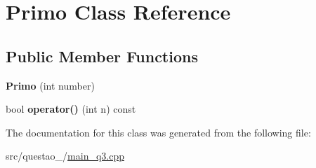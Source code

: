 \hypertarget{classPrimo}{}\section{Primo Class Reference}
\label{classPrimo}
\subsection*{Public Member Functions}
\begin{DoxyCompactItemize}
\item 
{\bfseries Primo} (int number)\hypertarget{classPrimo_ae5a273f531a2b0b1654744d3e13a5d4d}{}\label{classPrimo_ae5a273f531a2b0b1654744d3e13a5d4d}

\item 
bool {\bfseries operator()} (int n) const \hypertarget{classPrimo_acd6a2d019b6bd33cc1282ea895223276}{}\label{classPrimo_acd6a2d019b6bd33cc1282ea895223276}

\end{DoxyCompactItemize}


The documentation for this class was generated from the following file\+:\begin{DoxyCompactItemize}
\item 
src/questao\+\_/\hyperlink{main__q3_8cpp}{main\+\_\+q3.\+cpp}\end{DoxyCompactItemize}
